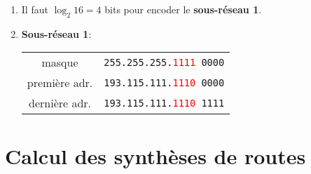 \documentclass[a4paper]{article}
\begin{document}
\begin{itemize}
\begin{example}
\begin{enumerate}
\begin{center}
\begin{tabular}{cc}
            \end{tabular}
        \end{center}
        \item Il faut $ \log_2 16 = 4 $ bits pour encoder le \textbf{sous-réseau 1}.
        \item \textbf{Sous-réseau 1}:
        \begin{center}
            \begin{tabular}{cc}
                masque & \texttt{255.255.255.\textcolor{red}{1111} 0000} \\
                première adr. & \texttt{193.115.111.\textcolor{red}{1110} 0000} \\
                dernière adr. & \texttt{193.115.111.\textcolor{red}{1110} 1111} \\
            \end{tabular}
        \end{center}
    \end{enumerate}
    \end{example}
\end{itemize}










\section{Calcul des synthèses de routes}
\end{document}
